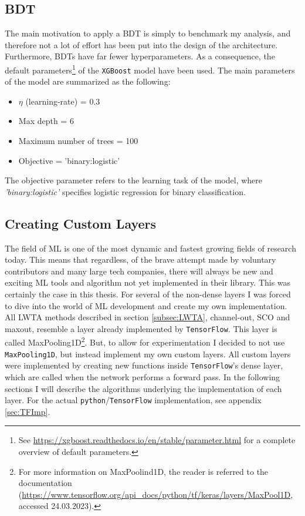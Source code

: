 \subsection*{BDT}\label{subsec:XGBoost}
The main motivation to apply a \ac{BDT} is simply to benchmark my analysis, and therefore not a lot of effort has been put into the design of the 
architecture. Furthermore, \ac{BDT}s have far fewer hyperparameters. As a consequence, the default parameters\footnote{See \url{https://xgboost.readthedocs.io/en/stable/parameter.html}
for a complete overview of default parameters.} of the \verb!XGBoost! model have been used. 
The main parameters of the model are summarized as the following:
\begin{itemize}
    \item $\eta$ (learning-rate) = 0.3
    \item Max depth = 6
    \item Maximum number of trees = 100
    \item Objective = 'binary:logistic'
\end{itemize}
The objective parameter refers to the learning task of the model, where \emph{'binary:logistic'} specifies logistic regression for binary classification.

\subsection{Creating Custom Layers}\label{subsec:CustomLayer}
The field of \ac{ML} is one of the most dynamic and fastest growing fields of research
today. This means that regardless, of the brave attempt made by voluntary contributors and many large tech companies,
there will always be new and exciting \ac{ML} tools and algorithm not yet implemented in their library. This was 
certainly the case in this thesis. For several of the non-dense layers I was forced
to dive into the world of \ac{ML} development and create my own implementation. 
\\
All \ac{LWTA} methods described in section \ref{subsec:LWTA}, channel-out, 
\ac{SCO} and maxout, resemble a layer already implemented by \verb!TensorFlow!. This layer is called 
MaxPooling1D\footnote{For more information on MaxPoolind1D, the reader is referred to the documentation 
(\url{https://www.tensorflow.org/api_docs/python/tf/keras/layers/MaxPool1D},
accessed 24.03.2023).}. But, to allow for experimentation I decided to not use \verb!MaxPooling1D!, but instead 
implement my own custom layers. All custom layers were implemented by creating new functions inside 
\verb!TensorFlow!'s dense layer, which are called when the network performs a forward pass. In the following sections 
I will describe the algorithms underlying the implementation of each layer. For the actual \verb!python!/\verb!TensorFlow! implementation,
see appendix \ref{sec:TFImp}.
